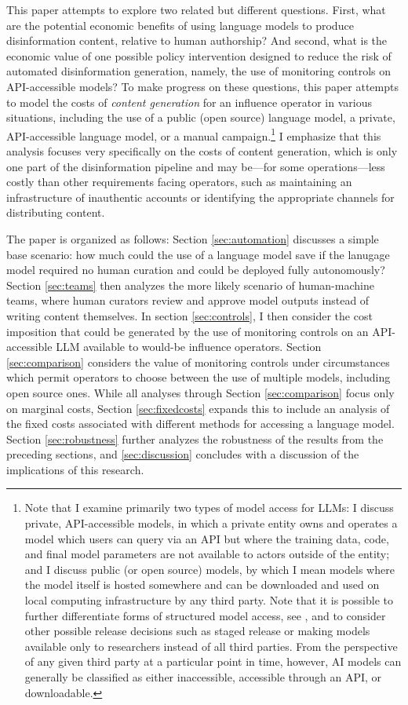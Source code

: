 \documentclass{article}
\begin{document}
This paper attempts to explore two related but different questions. First, what are the potential economic benefits of using language models to produce disinformation content, relative to human authorship? And second, what is the economic value of one possible policy intervention designed to reduce the risk of automated disinformation generation, namely, the use of monitoring controls on API-accessible models? To make progress on these questions, this paper attempts to model the costs of \textit{content generation} for an influence operator in various situations, including the use of a public (open source) language model, a private, API-accessible language model, or a manual campaign.\footnote{Note that I examine primarily two types of model access for LLMs: I discuss private, API-accessible models, in which a private entity owns and operates a model which users can query via an API but where the training data, code, and final model parameters are not available to actors outside of the entity; and I discuss public (or open source) models, by which I mean models where the model itself is hosted somewhere and can be downloaded and used on local computing infrastructure by any third party. Note that it is possible to further differentiate forms of structured model access, see \cite{shelvane, solaimanwired, solaiman}, and to consider other possible release decisions such as staged release or making models available only to researchers instead of all third parties. From the perspective of any given third party at a particular point in time, however, AI models can generally be classified as either inaccessible, accessible through an API, or downloadable.} I emphasize that this analysis focuses very specifically on the costs of content generation, which is only one part of the disinformation pipeline and may be—for some operations—less costly than other requirements facing operators, such as maintaining an infrastructure of inauthentic accounts or identifying the appropriate channels for distributing content. \cite{goldsteinpanel, sedova1}

The paper is organized as follows: Section \ref{sec:automation} discusses a simple base scenario: how much could the use of a language model save if the lanugage model required no human curation and could be deployed fully autonomously? Section \ref{sec:teams} then analyzes the more likely scenario of human-machine teams, where human curators review and approve model outputs instead of writing content themselves. In section \ref{sec:controls}, I then consider the cost imposition that could be generated by the use of monitoring controls on an API-accessible LLM available to would-be influence operators. Section \ref{sec:comparison} considers the value of monitoring controls under circumstances which permit operators to choose between the use of multiple models, including open source ones. While all analyses through Section \ref{sec:comparison} focus only on marginal costs, Section \ref{sec:fixedcosts} expands this to include an analysis of the fixed costs associated with different methods for accessing a language model. Section \ref{sec:robustness} further analyzes the robustness of the results from the preceding sections, and \ref{sec:discussion} concludes with a discussion of the implications of this research. 
\end{document}
